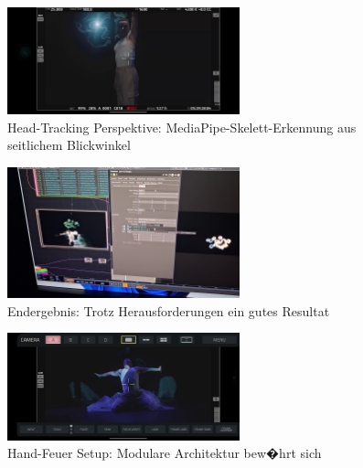 \begin{figure}[!htbp]
   \centering
   \includegraphics[width=0.6\textwidth,height=0.25\textheight,keepaspectratio]{images/HeadTrackingLeftSideOfHeadWithHeadClearlyAttached.png}
   \caption{Head-Tracking Perspektive: MediaPipe-Skelett-Erkennung aus seitlichem Blickwinkel}
   \label{fig:low_light_tracking}
\end{figure}

\begin{figure}[!htbp]
   \centering
   \includegraphics[width=0.6\textwidth,height=0.25\textheight,keepaspectratio]{images/HeadtrackingBubblesClearlyAtHeadLevelOnBackgroundBeamerMediaPipeSkeletonBeautifullyVisible.png}
   \caption{Endergebnis: Trotz Herausforderungen ein gutes Resultat}
   \label{fig:head_result}
\end{figure}

\begin{figure}[!htbp]
   \centering
   \includegraphics[width=0.6\textwidth,height=0.25\textheight,keepaspectratio]{images/HQCinemaCameraPerspectiveOfHandFireToTheSidesOfTheHands.png}
   \caption{Hand-Feuer Setup: Modulare Architektur bew�hrt sich}
   \label{fig:hand_fire_setup}
\end{figure}

